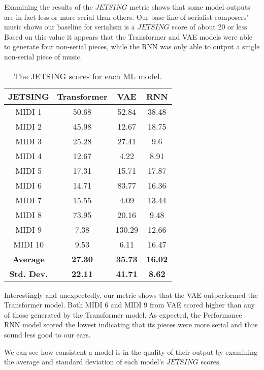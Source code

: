 \documentclass[11pt]{article}
\begin{document}
Examining the results of the $JETSING$ metric shows that some model outputs are in fact less or more serial than others.
Our base line of serialist composers' music shows our baseline for serialism is a $JETSING$ score of about 20 or less.
Based on this value it appears that the Transformer and VAE models were able to generate four non-serial pieces,
while the RNN was only able to output a single non-serial piece of music.

\begin{table}
    \centering
    \caption{The JETSING scores for each ML model.}
    \begin{tabular}{c c c c}
        \hline
        JETSING & Transformer & VAE & RNN \\
        \hline
        MIDI 1 & 50.68 & 52.84 & 38.48 \\
        \hline
        MIDI 2 & 45.98 & 12.67 & 18.75 \\
        \hline
        MIDI 3 & 25.28 & 27.41 & 9.6 \\
        \hline
        MIDI 4 & 12.67 & 4.22 & 8.91 \\
        \hline
        MIDI 5 & 17.31 & 15.71 & 17.87 \\
        \hline
        MIDI 6 & 14.71 & 83.77 & 16.36 \\
        \hline
        MIDI 7 & 15.55 & 4.09 & 13.44 \\
        \hline
        MIDI 8 & 73.95 & 20.16 & 9.48 \\
        \hline
        MIDI 9 & 7.38 & 130.29 & 12.66 \\
        \hline
        MIDI 10 & 9.53 & 6.11 & 16.47 \\
        \hline
        \hline
        \textbf{Average} & \textbf{27.30} & \textbf{35.73} & \textbf{16.02} \\
        \hline
        \textbf{Std. Dev.} & \textbf{22.11} & \textbf{41.71} & \textbf{8.62} \\
        \hline
    \end{tabular}
\end{table}

Interestingly and unexpectedly, our metric shows that the VAE outperformed the Transformer model.
Both MIDI 6 and MIDI 9 from VAE scored higher than any of those generated by the Transformer model.
As expected, the Performance RNN model scored the lowest indicating that its pieces were more serial and thus sound less good to our ears.

We can see how consistent a model is in the quality of their output by examining the average and standard deviation of each model's $JETSING$ scores.
\end{document}
